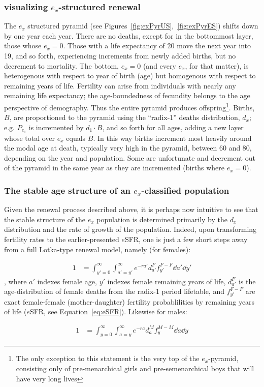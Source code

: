 \subsubsection{visualizing $e_x$-structured renewal}
The $e_x$ structured pyramid (see Figures~\ref{fig:exPyrUS},~\ref{fig:exPyrES})
shifts down by one year each year. There are no deaths, except for in 
the bottommost layer, those whose $e_x = 0$. Those with a life
expectancy of 20 move the next year into 19, and so forth, experiencing
increments from newly added births, but no decrement to mortality. The bottom,
$e_x = 0$ (and every $e_x$, for that matter), is heterogenous with 
respect to year of birth (age) but homogenous with respect to remaining 
years of life. Fertility can arise from individuals with nearly any remaining life
expectancy; the age-boundedness of fecundity belongs to the age
perspective of demography. Thus the entire pyramid produces offspring\footnote{The only exception
to this statement is the very top of the $e_x$-pyramid, consisting only of
pre-menarchical girls and pre-semenarchical boys that will have very long
lives}. Births, $B$, are proportioned to the pyramid using the ``radix-1''
deaths distribution, $d_x$; e.g. $P_{e_1}$ is incremented by $d_1 \cdot B$, and
so forth for all ages, adding a new layer whose total over $e_x$ equals $B$. In this way births
increment most heavily around the modal age at death, typically very high in the
pyramid, between 60 and 80, depending on the year and population. Some are
unfortunate and decrement out of the pyramid in the same year as they are
incremented (births where $e_x = 0$).

\subsubsection{The stable age structure of an $e_x$-classified population}
Given the renewal process described above, it is perhaps now intuitive to see
that the stable structure of the $e_x$ population is determined primarily by 
the $d_x$ distribution and the rate of growth of the
population. Indeed, upon transforming fertility rates to the earlier-presented
$e$SFR, one is just a few short steps away from a full Lotka-type renewal
model, namely (for females):

\begin{align}
1 &= \int _{y'=0}^\infty \int _{a'=y'}^\infty e^{-ra'} d_{a'}^F f_{y'}^{F-F} \dd
a' \dd y'
\end{align}
, where $a'$ indexes female age, $y'$ indexes female remaining years of life,
$d_{a'}^F$ is the age-distribution of female deaths from the radix-1 period
lifetable, and $f_{y'}^{F-F}$ are exact female-female (mother-daughter)
fertility probablilities by remaining years of life ($e$SFR, see Equation~\eqref{eq:eSFR}). Likewise for males:

\begin{align}
1 &= \int _{y=0}^\infty \int _{a=y}^\infty e^{-ra} d_a^M f_y^{M-M} \dd a \dd y
\end{align}








